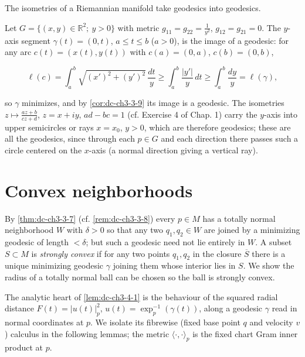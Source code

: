 \begin{example}
  \label{ex:dc-ch3-3-10}
  \notready
  The isometries of a Riemannian manifold take geodesics into geodesics.
  
  Let $G=\{(x,y)\in\mathbb{R}^2;\ y>0\}$ with metric $g_{11}=g_{22}=\frac{1}{y^2}$,
  $g_{12}=g_{21}=0$. The $y$-axis segment $\gamma(t)=(0,t)$, $a\le t\le b$ ($a>0$),
  is the image of a geodesic: for any arc $c(t)=(x(t),y(t))$ with $c(a)=(0,a)$,
  $c(b)=(0,b)$,
  
  $$
  \ell(c)=\int_a^b\sqrt{(x')^2+(y')^2}\,\frac{dt}{y}\ge\int_a^b\frac{|y'|}{y}\,dt\ge\int_a^b\frac{dy}{y}=\ell(\gamma),
  $$
  
  so $\gamma$ minimizes, and by \cref{cor:dc-ch3-3-9} its image is a geodesic. The
  isometries $z\mapsto\frac{az+b}{cz+d}$, $z=x+iy$, $ad-bc=1$ (cf. Exercise 4 of
  Chap. 1) carry the $y$-axis into upper semicircles or rays $x=x_0$, $y>0$, which
  are therefore geodesics; these are all the geodesics, since through each $p\in G$
  and each direction there passes such a circle centered on the $x$-axis (a normal
  direction giving a vertical ray).
\end{example}

\section{Convex neighborhoods}

By \cref{thm:dc-ch3-3-7} (cf. \cref{rem:dc-ch3-3-8}) every $p\in M$ has a totally normal neighborhood
$W$ with $\delta>0$ so that any two $q_1,q_2\in W$ are joined by a minimizing
geodesic of length $<\delta$; but such a geodesic need not lie entirely in $W$. A
subset $S\subset M$ is \emph{strongly convex} if for any two points $q_1,q_2$ in the
closure $\overline{S}$ there is a unique minimizing geodesic $\gamma$ joining them
whose interior lies in $S$. We show the radius of a totally normal ball can be
chosen so the ball is strongly convex.

The analytic heart of \cref{lem:dc-ch3-4-1} is the behaviour of the squared radial
distance $F(t)=|u(t)|_p^2$, $u(t)=\exp_p^{-1}(\gamma(t))$, along a geodesic $\gamma$
read in normal coordinates at $p$. We isolate its fibrewise (fixed base point $q$
and velocity $v$) calculus in the following lemmas; the metric
$\langle\cdot,\cdot\rangle_p$ is the fixed chart Gram inner product at $p$.

